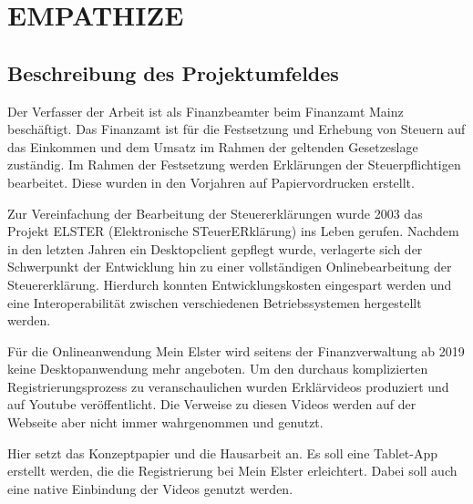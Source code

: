 


\section{EMPATHIZE}\label{EMPATHIZE}
\subsection{Beschreibung des Projektumfeldes}\label{Beschreibung des Projektumfeldes}
Der Verfasser der Arbeit ist als Finanzbeamter beim Finanzamt Mainz beschäftigt.
Das Finanzamt ist für die Festsetzung und Erhebung von Steuern auf das Einkommen und dem Umsatz im Rahmen der geltenden Gesetzeslage zuständig. Im Rahmen der Festsetzung werden Erklärungen der Steuerpflichtigen bearbeitet. Diese wurden in den Vorjahren auf Papiervordrucken erstellt. 

Zur Vereinfachung der Bearbeitung der Steuererklärungen wurde 2003 das Projekt ELSTER (\grq{}Elektronische STeuerERklärung\grq{}) ins Leben gerufen. Nachdem in den letzten Jahren ein Desktopclient gepflegt wurde, verlagerte sich der Schwerpunkt der Entwicklung hin zu einer vollständigen Onlinebearbeitung der Steuererklärung. Hierdurch konnten Entwicklungskosten eingespart werden und eine Interoperabilität zwischen verschiedenen Betriebssystemen hergestellt werden.

Für die Onlineanwendung \grq{}Mein Elster\grq{} wird seitens der Finanzverwaltung ab 2019 keine Desktopanwendung mehr angeboten.
Um den durchaus komplizierten Registrierungsprozess zu veranschaulichen wurden Erklärvideos produziert und auf Youtube veröffentlicht. Die Verweise zu diesen Videos werden auf der Webseite aber nicht immer wahrgenommen und genutzt. 

Hier setzt das Konzeptpapier und die Hausarbeit an. Es soll eine Tablet-App erstellt werden, die die Registrierung bei \grq{}Mein Elster\grq{} erleichtert. Dabei soll auch eine native Einbindung der Videos genutzt werden.




